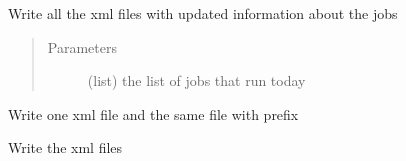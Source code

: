 \documentclass[a4paper,10pt,english]{sphinxmanual}
\begin{document}
\begin{fulllineitems}
\begin{fulllineitems}
\begin{quote}
\begin{description}
\begin{itemize}
\end{itemize}

\end{description}\end{quote}

\end{fulllineitems}


\begin{fulllineitems}
\label{\detokenize{apidoc_commands/commands:commands.jobs.Gui.update_xml_files}}
Write all the xml files with updated information about the jobs
\begin{quote}\begin{description}
\item[{Parameters}] \leavevmode
{} \textendash{} (list) the list of jobs that run today

\end{description}\end{quote}

\end{fulllineitems}


\begin{fulllineitems}
\label{\detokenize{apidoc_commands/commands:commands.jobs.Gui.write_xml_file}}
Write one xml file and the same file with prefix

\end{fulllineitems}


\begin{fulllineitems}
\label{\detokenize{apidoc_commands/commands:commands.jobs.Gui.write_xml_files}}
Write the xml files

\end{fulllineitems}


\end{fulllineitems}

\end{document}
